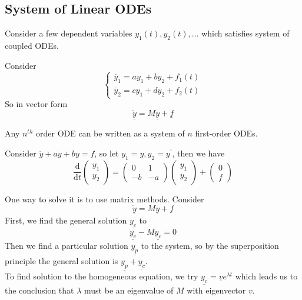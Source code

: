 \subsection{System of Linear ODEs}
Consider a few dependent variables $y_1(t),y_2(t),\ldots$ which satisfies system of coupled ODEs.
\begin{example}
    Consider
    $$
    \begin{cases}
        \dot{y_1}=ay_1+by_2+f_1(t)\\
        \dot{y_2}=cy_1+dy_2+f_2(t)
    \end{cases}
    $$
    So in vector form
    $$\underline{\dot{y}}=M\underline{y}+\underline{f}$$
\end{example}
Any $n^{th}$ order ODE can be written as a system of $n$ first-order ODEs.
\begin{example}
    Consider $\ddot{y}+a\dot{y}+by=f$, so let $y_1=y,y_2=y^\prime$, then we have
    $$\frac{\mathrm d}{\mathrm dt}\begin{pmatrix}
        y_1\\
        y_2
    \end{pmatrix}=
    \begin{pmatrix}
        0&1\\
        -b&-a
    \end{pmatrix}
    \begin{pmatrix}
        y_1\\
        y_2
    \end{pmatrix}+
    \begin{pmatrix}
        0\\
        f
    \end{pmatrix}$$
\end{example}
One way to solve it is to use matrix methods.
Consider
$$\underline{\dot{y}}=M\underline{y}+\underline{f}$$
First, we find the general solution $\underline{y_c}$ to
$$\underline{\dot{y}_c}-M\underline{y_c}=0$$
Then we find a particular solution $\underline{y_p}$ to the system, so by the superposition principle the general solution is $\underline{y_p}+\underline{y_c}$.\\
To find solution to the homogeneous equation, we try $\underline{y_c}=\underline{v}e^{\lambda t}$ which leads us to the conclusion that $\lambda$ must be an eigenvalue of $M$ with eigenvector $\underline{v}$.
